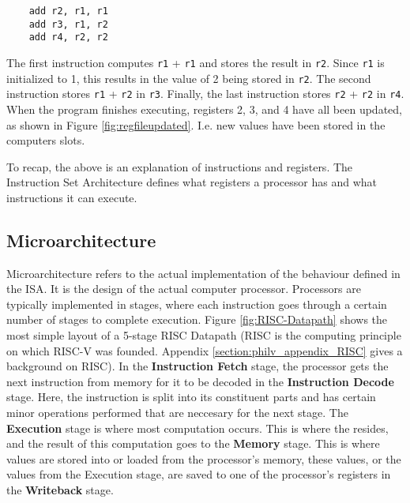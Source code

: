     \begin{verbatim}
    add r2, r1, r1
    add r3, r1, r2
    add r4, r2, r2
    \end{verbatim}
    The first instruction computes \texttt{r1} + \texttt{r1} and stores the result in \texttt{r2}. Since \texttt{r1} is initialized to 1, this results in the value of 2 being stored in \texttt{r2}. The second instruction stores \texttt{r1} + \texttt{r2} in \texttt{r3}. Finally, the last instruction stores \texttt{r2} + \texttt{r2} in \texttt{r4}. When the program finishes executing, registers 2, 3, and 4 have all been updated, as shown in Figure \ref{fig:regfileupdated}. I.e. new values have been stored in the computers slots.

    

    To recap, the above is an explanation of instructions and registers. The Instruction Set Architecture defines what registers a processor has and what instructions it can execute.

\subsection{Microarchitecture}

    

    Microarchitecture refers to the actual implementation of the behaviour defined in the \gls{ISA}. It is the design of the actual computer processor. Processors are typically implemented in stages, where each instruction goes through a certain number of stages to complete execution.
    Figure \ref{fig:RISC-Datapath} shows the most simple layout of a 5-stage \gls{RISC} Datapath (\gls{RISC} is the computing principle on which RISC-V was founded. Appendix \ref{section:philv_appendix_RISC} gives a background on RISC). In the \textbf{Instruction Fetch} stage, the processor gets the next instruction from memory for it to be decoded in the \textbf{Instruction Decode} stage. Here, the instruction is split into its constituent parts and has certain minor operations performed that are neccesary for the next stage. The \textbf{Execution} stage is where most computation occurs. This is where the  resides, and the result of this computation goes to the \textbf{Memory} stage. This is where values are stored into or loaded from the processor's memory, these values, or the values from the Execution stage, are saved to one of the processor's registers in the \textbf{Writeback} stage. 
